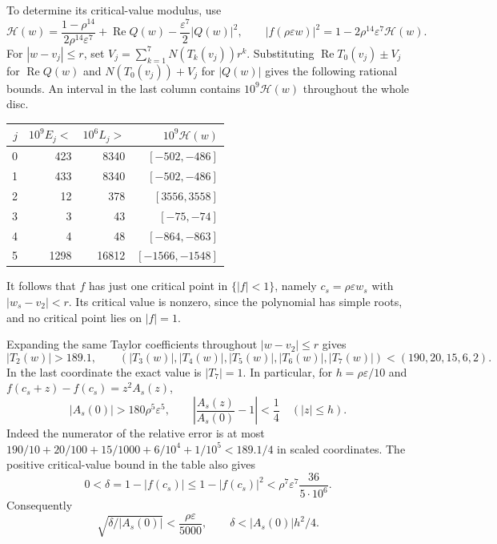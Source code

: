 To determine its critical-value modulus, use
\[
 \mathscr H(w)=\frac{1-\rho^{14}}{2\rho^{14}\varepsilon^7}
       +\operatorname{Re}Q(w)-\frac{\varepsilon^7}{2}|Q(w)|^2,
 \qquad |f(\rho\varepsilon w)|^2
       =1-2\rho^{14}\varepsilon^7\mathscr H(w).
\]
For $|w-v_j|\le r$, set
$V_j=\sum_{k=1}^7N(T_k(v_j))r^k$. Substituting
$\operatorname{Re}T_0(v_j)\pm V_j$ for $\operatorname{Re}Q(w)$ and
$N(T_0(v_j))+V_j$ for $|Q(w)|$ gives the following rational bounds.
An interval in the last column contains $10^9\mathscr H(w)$ throughout
the whole disc.
\begin{center}
\begin{tabular}{@{}rrrr@{}}
\toprule
$j$&$10^9 E_j<$&$10^6 L_j>$&$10^9\mathscr H(w)$\\
\midrule
0&423&8340&$[-502,-486]$\\
1&433&8340&$[-502,-486]$\\
2&12&378&$[3556,3558]$\\
3&3&43&$[-75,-74]$\\
4&4&48&$[-864,-863]$\\
5&1298&16812&$[-1566,-1548]$\\
\bottomrule
\end{tabular}
\end{center}
It follows that $f$ has just one critical point in $\{|f|<1\}$, namely
$c_s=\rho\varepsilon w_s$ with $|w_s-v_2|<r$. Its critical value is
nonzero, since the polynomial has simple roots, and no critical point
lies on $|f|=1$.

Expanding the same Taylor coefficients throughout $|w-v_2|\le r$ gives
\[
 |T_2(w)|>189.1,\qquad
 (|T_3(w)|,|T_4(w)|,|T_5(w)|,|T_6(w)|,|T_7(w)|)
 <(190,20,15,6,2).
\]
In the last coordinate the exact value is $|T_7|=1$. In particular, for
$h=\rho\varepsilon/10$ and
$f(c_s+z)-f(c_s)=z^2A_s(z)$,
\begin{equation}\label{eq:counterexample-local-bounds}
 |A_s(0)|>180\rho^5\varepsilon^5,
 \qquad
 \left|\frac{A_s(z)}{A_s(0)}-1\right|<\frac14\quad(|z|\le h).
\end{equation}
Indeed the numerator of the relative error is at most
$190/10+20/100+15/1000+6/10^4+1/10^5<189.1/4$ in scaled
coordinates. The positive critical-value bound in the table also gives
\[
 0<\delta=1-|f(c_s)|
 \le 1-|f(c_s)|^2
 <\rho^7\varepsilon^7\frac{36}{5\cdot10^6}.
\]
Consequently
\begin{equation}\label{eq:counterexample-radius}
 \sqrt{\delta/|A_s(0)|}<\frac{\rho\varepsilon}{5000},
 \qquad \delta<|A_s(0)|h^2/4.
\end{equation}

